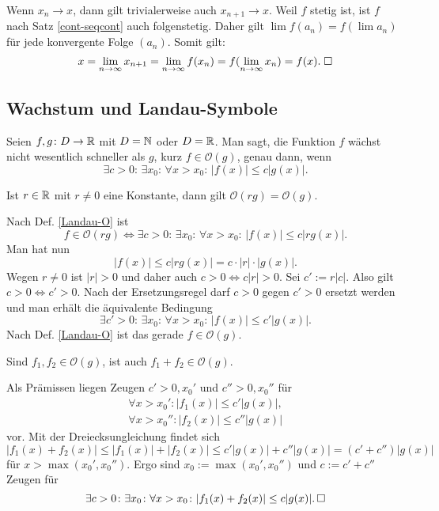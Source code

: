 \begin{Beweis}
Wenn $x_n\to x$, dann gilt trivialerweise auch $x_{n+1}\to x$.
Weil $f$ stetig ist, ist $f$ nach Satz \ref{cont-seqcont}
auch folgenstetig. Daher gilt $\lim f(a_n) = f(\lim a_n)$ für jede
konvergente Folge $(a_n)$. Somit gilt:
\[x=\lim_{n\to\infty} x_{n+1} = \lim_{n\to\infty} f(x_n)
= f(\lim_{n\to\infty} x_n) = f(x).\;\square\]
\end{Beweis}

\subsection{Wachstum und Landau-Symbole}
\begin{Definition}\label{Landau-O}
Seien $f,g\colon D\to\mathbb R$ mit $D=\mathbb N$ oder $D=\mathbb R$. Man sagt, die
Funktion $f$ wächst nicht wesentlich schneller als $g$, kurz
$f\in\mathcal O(g)$, genau dann, wenn
\[\exists c{>}0\colon\,\exists x_0\colon\,\forall x{>}x_0\colon\, |f(x)|\le c|g(x)|.\]
\end{Definition}

\begin{Korollar}
Ist $r\in\mathbb R$ mit $r\ne 0$ eine Konstante, dann gilt
$\mathcal O(rg)=\mathcal O(g)$.
\end{Korollar}
\begin{Beweis}
Nach Def. \ref{Landau-O} ist
\[f\in\mathcal O(rg) \iff 
\exists c{>}0\colon\,\exists x_0\colon\,\forall x{>}x_0\colon\,|f(x)|\le c|rg(x)|.\]
Man hat nun
\[|f(x)|\le c|rg(x)| = c\cdot |r|\cdot |g(x)|.\]
Wegen $r\ne 0$ ist $|r|>0$ und daher auch $c>0\iff c|r|>0$. Sei
$c':=r|c|$. Also gilt $c>0\iff c'>0$. Nach der Ersetzungsregel
darf $c>0$ gegen $c'>0$ ersetzt werden und man erhält die
äquivalente Bedingung
\[\exists c'{>}0\colon\,\exists x_0\colon\,
\forall x{>}x_0\colon\,|f(x)|\le c'|g(x)|.\]
Nach Def. \ref{Landau-O} ist das gerade $f\in\mathcal O(g)$.\;\qedsymbol
\end{Beweis}

\begin{Korollar}
Sind $f_1,f_2\in\mathcal O(g)$, ist auch $f_1+f_2\in\mathcal O(g)$.
\end{Korollar}
\begin{Beweis}
Als Prämissen liegen Zeugen $c'>0,x_0'$ und $c''>0,x_0''$ für
\begin{gather*}
\forall x>x_0'\colon |f_1(x)|\le c'|g(x)|,\\
\forall x>x_0''\colon |f_2(x)|\le c''|g(x)|
\end{gather*}
vor. Mit der Dreiecksungleichung findet sich
\[|f_1(x)+f_2(x)|\le |f_1(x)|+|f_2(x)| \le c'|g(x)|+c''|g(x)| = (c'+c'')|g(x)|\]
für $x>\max(x_0',x_0'')$. Ergo sind $x_0:=\max(x_0',x_0'')$ und $c:=c'+c''$
Zeugen für
\[\exists c>0\colon\exists x_0\colon\forall x>x_0\colon |f_1(x)+f_2(x)|\le c|g(x)|.\,\square\]
\end{Beweis}


